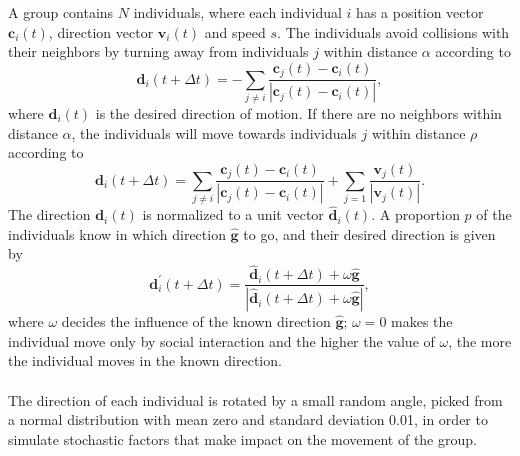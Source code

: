 A group contains $N$ individuals, where each individual $i$ has a position vector $\boldsymbol{c}_i(t)$, direction vector $\boldsymbol{v}_i(t)$ and speed $s$. 
The individuals avoid collisions with their neighbors by turning away from individuals $j$ within distance $\alpha$ according to
\begin{equation}
\boldsymbol{d}_i (t+\Delta t) = - \sum_{j \neq i} \frac{\boldsymbol{c}_j (t) - \boldsymbol{c}_i (t)}{|\boldsymbol{c}_j (t) - \boldsymbol{c}_i (t) |},
\label{eq:repulsion}
\end{equation}
where $\boldsymbol{d}_i(t)$ is the desired direction of motion. 
If there are no neighbors within distance $\alpha$, the individuals will move towards individuals $j$ within distance $\rho$ according to
\begin{equation}
\boldsymbol{d}_i (t+\Delta t) = \sum_{j \neq i} \frac{\boldsymbol{c}_j (t)- \boldsymbol{c}_i (t)}{|\boldsymbol{c}_j (t) - \boldsymbol{c}_i (t)|} + \sum_{j = 1} \frac{\boldsymbol{v}_j (t)}{|\boldsymbol{v}_j (t)|}.
\label{eq:attraction}
\end{equation}
The direction $\boldsymbol{d}_i(t)$ is normalized to a unit vector $\hat{\boldsymbol{d}}_i(t)$. 
A proportion $p$ of the individuals know in which direction $\hat{\boldsymbol{g}}$ to go, and their desired direction is given by
\begin{equation}
\boldsymbol{d}_i^\prime (t+\Delta t) = \frac{\hat{\boldsymbol{d}}_i (t+\Delta t) + \omega \hat{\boldsymbol{g}}}{|\hat{\boldsymbol{d}}_i (t+\Delta t) + \omega \hat{\boldsymbol{g}}|},
\label{eq:attraction}
\end{equation}
where $\omega$ decides the influence of the known direction $\hat{\boldsymbol{g}}$; $\omega=0$ makes the individual move only by social interaction and the higher the value of $\omega$, the more the individual moves in the known direction.
\\\\
The direction of each individual is rotated by a small random angle, picked from a normal distribution with mean zero and standard deviation 0.01, in order to simulate stochastic factors that make impact on the movement of the group. 